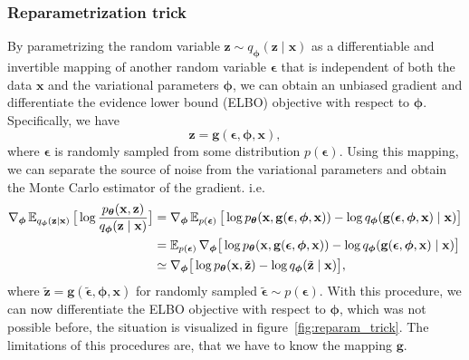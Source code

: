 \subsubsection{Reparametrization trick}
By parametrizing the random variable $\mathbf{z} \sim q_{\boldsymbol{\phi}}(\mathbf{z}\mid \mathbf{x})$ as a differentiable and invertible mapping of another random variable $\boldsymbol{\epsilon}$ that is independent
of both the data $\mathbf{x}$ and the variational parameters ${\boldsymbol{\phi}}$, we can obtain an unbiased gradient and differentiate the evidence lower bound (ELBO) objective with respect to ${\boldsymbol{\phi}}$. 
Specifically, we have 
\begin{equation*}
    \mathbf{z} = \mathbf{g}(\boldsymbol{\epsilon},{\boldsymbol{\phi}},\mathbf{x}),
\end{equation*}
where $\boldsymbol{\epsilon}$ is randomly sampled from some distribution $p(\boldsymbol{\epsilon})$. Using this mapping, we can separate the source of noise from the variational parameters and 
obtain the Monte Carlo estimator of the gradient. i.e.
\begin{align*}
    \nabla_{{\boldsymbol{\phi}}} \operatorname{\mathbb{E}}_{q_{\boldsymbol{\phi}}(\mathbf{z}\mid \mathbf{x})} \big[\log \frac{p_{\boldsymbol{\theta}}(\mathbf{x},\mathbf{z})}{q_{\boldsymbol{\phi}}(\mathbf{z}\mid \mathbf{x})}\big] 
    &= \nabla_{{\boldsymbol{\phi}}} \operatorname{\mathbb{E}}_{p(\boldsymbol{\epsilon})} \big[\log p_{\boldsymbol{\theta}}(\mathbf{x},\mathbf{g}(\boldsymbol{\epsilon},{\boldsymbol{\phi}},\mathbf{x})) - \log q_{\boldsymbol{\phi}}(\mathbf{g}(\boldsymbol{\epsilon},{\boldsymbol{\phi}},\mathbf{x})\mid \mathbf{x})\big]\\
    &=  \operatorname{\mathbb{E}}_{p(\boldsymbol{\epsilon})} \nabla_{{\boldsymbol{\phi}}} \big[\log p_{\boldsymbol{\theta}}(\mathbf{x},\mathbf{g}(\boldsymbol{\epsilon},{\boldsymbol{\phi}},\mathbf{x})) - \log q_{\boldsymbol{\phi}}(\mathbf{g}(\boldsymbol{\epsilon},{\boldsymbol{\phi}},\mathbf{x})\mid \mathbf{x})\big] \\
    &\simeq \nabla_{{\boldsymbol{\phi}}} \big[\log p_{\boldsymbol{\theta}}(\mathbf{x},\tilde{\mathbf{z}}) - \log q_{\boldsymbol{\phi}}(\tilde{\mathbf{z}}\mid \mathbf{x})\big],
\end{align*}
where $\tilde{\mathbf{z}} = \mathbf{g}(\tilde{\boldsymbol{\epsilon}},{\boldsymbol{\phi}},\mathbf{x})$  for randomly sampled $\tilde{\boldsymbol{\epsilon}} \sim p(\boldsymbol{\epsilon})$. 
With this procedure, we can now differentiate the ELBO objective with respect to ${\boldsymbol{\phi}}$, which was not possible before, the situation is visualized in figure~\ref{fig:reparam_trick}. The limitations of this procedures are, that we have to know the mapping $\mathbf{g}$.
